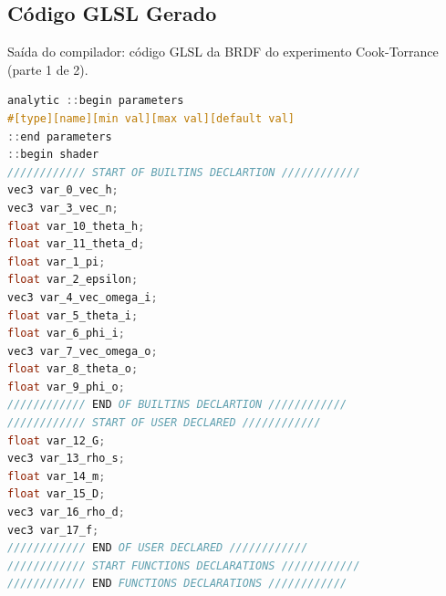 \subsection{Código GLSL Gerado}
\begin{codigo}[H]
    \caption{\small Saída do compilador: código GLSL da BRDF do experimento Cook-Torrance (parte 1 de 2).}
    \label{cod-cook-torrance-glsl-pt-1}
\begin{lstlisting}[language=C, inputencoding=utf8]
analytic ::begin parameters
#[type][name][min val][max val][default val]
::end parameters
::begin shader
//////////// START OF BUILTINS DECLARTION ////////////
vec3 var_0_vec_h;
vec3 var_3_vec_n;
float var_10_theta_h;
float var_11_theta_d;
float var_1_pi;
float var_2_epsilon;
vec3 var_4_vec_omega_i;
float var_5_theta_i;
float var_6_phi_i;
vec3 var_7_vec_omega_o;
float var_8_theta_o;
float var_9_phi_o;
//////////// END OF BUILTINS DECLARTION ////////////
//////////// START OF USER DECLARED ////////////
float var_12_G;
vec3 var_13_rho_s;
float var_14_m;
float var_15_D;
vec3 var_16_rho_d;
vec3 var_17_f;
//////////// END OF USER DECLARED ////////////
//////////// START FUNCTIONS DECLARATIONS ////////////
//////////// END FUNCTIONS DECLARATIONS ////////////
\end{lstlisting}
\end{codigo}


